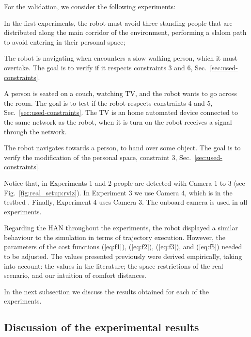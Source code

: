 \documentclass[5p,time]{elsarticle}
\begin{document}
For the validation, we consider the following experiments:
\begin{list}{\bf Experiment :\ }{\setlength{\labelwidth}{0.5cm}\setlength{\labelsep}{0cm}\setlength{\leftmargin}{0.5cm}}
	\item In the first experiments, the robot must avoid three standing people that are distributed along
	the main corridor of the environment, performing a slalom path to avoid entering in their personal space;
	\item The robot is navigating when encounters a slow walking person, which it must overtake. The goal is to verify if it respects constraints 3 and 6, Sec.~\ref{sec:used-constraints}.
	\item A person is seated on a couch, watching TV, and the robot wants to go across the room. The goal is to test if the robot respects constraints 4 and 5, Sec.~\ref{sec:used-constraints}. The TV is an home automated device connected to the same network as the robot, when it is turn on the robot receives a signal through the network.
	\item The robot navigates towards a person, to hand over some object. The goal is to verify the modification of the personal space, constraint 3, Sec.~\ref{sec:used-constraints}.
\end{list}

Notice that, in Experiments 1 and 2 people are detected with Camera 1 to 3 (see Fig.~\ref{fig:real_setup:rviz}). In Experiment 3 we use Camera 4, which is in the testbed \cite{miraldo2015}. Finally, Experiment 4 uses Camera 3. The onboard camera is used in all experiments.

Regarding the HAN throughout the experiments, the robot displayed a similar behaviour to the simulation in terms of trajectory execution. However, the parameters of the cost functions (\ref{eq:f1}), (\ref{eq:f2}), (\ref{eq:f3}), and (\ref{eq:f5}) needed to be adjusted. The values presented previously were derived empirically, taking into account: the values in the literature; the space restrictions of the real scenario, and our intuition of comfort distances.

In the next subsection we discuss the results obtained for each of the experiments.

\subsection{Discussion of the experimental results}
\end{document}
